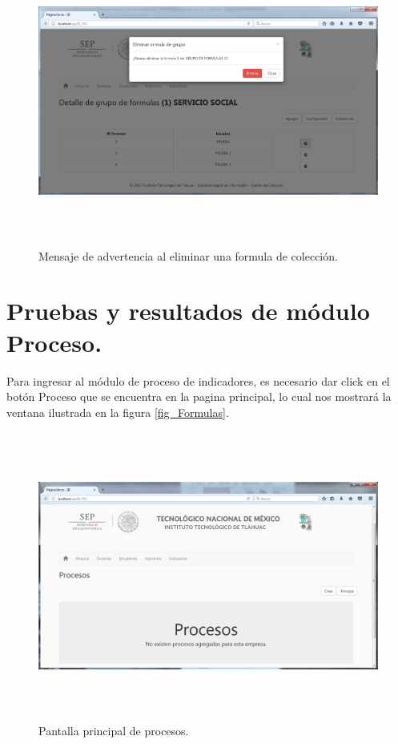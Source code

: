 				\begin{figure}[]
			        \centering
			        \includegraphics[width=16cm, height=9.5cm]{figuras/ColeccionesDetalleEliminar}
			        \caption{Mensaje de advertencia al eliminar una formula de colecci\'on.}
			        \label{fig_ColeccionesDetalleEliminar}
			    \end{figure}














		\section{Pruebas y resultados de m\'odulo Proceso.}
			   

			Para ingresar al m\'odulo de proceso de indicadores, es necesario dar click en el bot\'on Proceso que se encuentra en la pagina principal, lo cual nos mostrar\'a la ventana ilustrada en la figura \ref{fig_Formulas}.


			\begin{figure}[H]
		        \centering
		        \includegraphics[width=16cm, height=9.5cm]{figuras/Procesos}
		        \caption{Pantalla principal de procesos.}
		        \label{fig_Procesos}
		    \end{figure}
			
